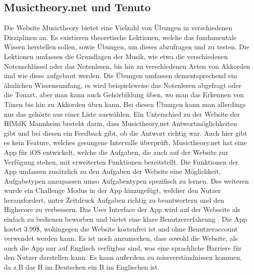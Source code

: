 \subsection*{Musictheory.net und Tenuto}
\label{sec:Musictheory.net} \label{sec:Tenuto}
Die Website Musictheory bietet eine Vielzahl von Übungen in verschiedenen Disziplinen an. Es existieren theoretische Lektionen, welche das fundamentale Wissen herstellen sollen, sowie Übungen, um dieses abzufragen und zu testen. 
Die Lektionen umfassen die Grundlagen der Musik, wie etwa die verschiedenen Notenschlüssel oder das Notenlesen, bis hin zu verschiedenen Arten von Akkorden und wie diese aufgebaut werden. Die Übungen umfassen dementsprechend ein ähnlichen Wissensumfang, es wird beispielsweise das Notenlesen abgefragt oder die Tonart, aber man kann auch Gehörbildung üben, wo man das Erkennen von Tönen bis hin zu Akkorden üben kann. Bei diesen Übungen kann man
allerdings nur das gehörte aus einer Liste auswählen. Ein Unterschied zu der Website der HfMdK Mannheim besteht darin, dass Musictheory.net Antwortmöglichkeiten gibt und bei diesen ein Feedback gibt, ob 
die Antwort richtig war. Auch hier gibt es kein Feature, welches gesungene Intervalle überprüft. Musictheory.net hat eine App für iOS entwickelt, welche die Aufgaben, die auch auf der Website zur Verfügung stehen,
mit erweiterten Funktionen bereitstellt. Die Funktionen der App umfassen zusätzlich zu den Aufgaben der Website eine Möglichkeit, Aufgabetypen anzupassen umso Aufgabentypen spezifisch zu lernen. Des weiteren wurde ein Challenge Modus in der App hinzugefügt, welcher den Nutzer herausfordert, unter Zeitdruck Aufgaben richtig zu beantwortern und den Highscore zu verbessern. Das User Interface der App wird auf der Webseite als einfach zu bedienen beworben und bietet eine klare Benutzererfahrung . 
Die App kostet 3.99\$, wohingegen die Website kostenfrei ist und ohne Benutzeraccount verwendet werden kann. Es ist noch anzumerken, dass sowohl die Website, als auch die App nur auf Englisch verfügbar sind, was eine sprachliche Barriere für den Nutzer darstellen kann. Es kann außerdem zu missverständnissen kommen, da z.B das H im Deutschen ein B im Englischen ist. \cite{musictheory}

